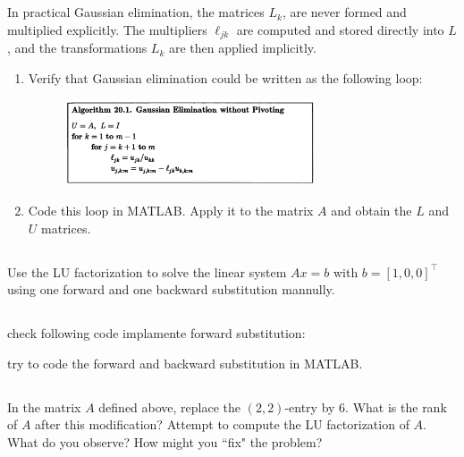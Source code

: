 \documentclass{article}%
\begin{document}
\subsection{}
In practical Gaussian elimination, the matrices $L_k$, are never formed and multiplied explicitly. The multipliers $\ell_{jk}$ are computed and stored directly into $L$, and the transformations $L_k$ are then applied implicitly.

\begin{enumerate}
    \item Verify that Gaussian elimination could be written as the following loop:
    \begin{figure}[H]
        \centering
        \includegraphics[width = 0.7\textwidth]{figs/TB97_Guass_wo_piv}
    \end{figure}
    \item Code this loop in MATLAB. Apply it to the matrix $A$ and obtain the $L$ and $U$ matrices.
\end{enumerate}

\subsection{}
Use the LU factorization to solve the linear system $Ax=b$ with
$b=[1, 0, 0]^\top$ using one forward and one backward substitution mannully. 

\subsection{}
check following code implamente forward substitution:

try to code the forward and backward substitution in MATLAB.


  
\subsection{}
In the matrix $A$ defined above, replace the $(2,2)$-entry by $6$.
What is the rank of $A$ after this modification?
Attempt to compute the LU factorization of $A$. 
What do you observe?
How might you ``fix" the problem?
\end{document}
